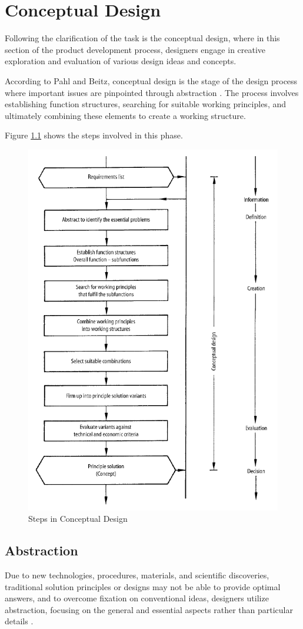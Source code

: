 \chapter{Conceptual Design}
Following the clarification of the task is the conceptual design, where in this section of the product development process, designers engage in creative exploration and evaluation of various design ideas and concepts.

According to Pahl and Beitz, conceptual design is the stage of the design process where important issues are pinpointed through abstraction  \cite{Pahl07d}. The process involves establishing function structures, searching for suitable working principles, and ultimately combining these elements to create a working structure.

Figure \ref{fig:steps-conceptual-design} shows the steps involved in this phase.

\begin{figure}[ht!]
    \centering
    \includegraphics[width=0.7\linewidth]{texs/Part1/chapter3/image/conceptual.png}
    \caption{Steps in Conceptual Design \cite{Pahl07p}}
    \label{fig:steps-conceptual-design}
\end{figure}


\section{Abstraction}
Due to new technologies, procedures, materials, and scientific discoveries, traditional solution principles or designs may not be able to provide optimal answers, and to overcome fixation on conventional ideas, designers utilize abstraction, focusing on the general and essential aspects rather than particular details \cite{Pahl07b}.

